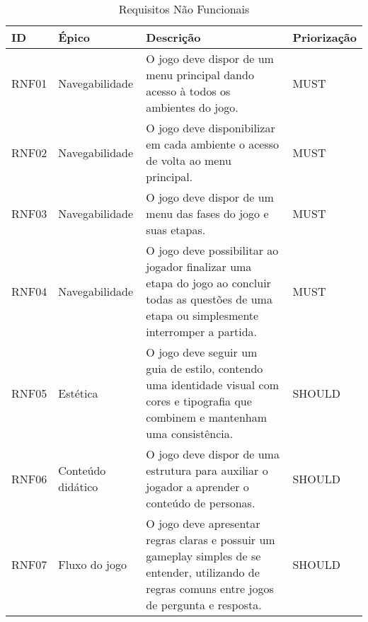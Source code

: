 \begin{table}[htbp]
    \centering
\caption{\textcolor{textmodified}{Requisitos Não Funcionais}}
\label{tab:Table_rnf}
\begin{tabular}{|p{1.3cm}|p{2.7cm}|p{8cm}|p{2.1cm}|}
\hline
ID    & Épico                        & Descrição & Priorização \\ \hline

\textcolor{textmodified}{ RNF01} & \textcolor{textmodified}{Navegabilidade}                & \textcolor{textmodified}{O jogo deve dispor de um menu principal dando acesso à todos os ambientes do jogo.} & \textcolor{textadded}{MUST} \\ \hline

\textcolor{textmodified}{ RNF02} & \textcolor{textmodified}{Navegabilidade}                & \textcolor{textmodified}{O jogo deve disponibilizar em cada ambiente o acesso de volta ao menu principal.} & \textcolor{textadded}{MUST} \\ \hline

\textcolor{textmodified}{ RNF03} & \textcolor{textmodified}{Navegabilidade}                & \textcolor{textmodified}{O jogo deve dispor de um menu das fases do jogo e suas etapas.} & \textcolor{textadded}{MUST} \\ \hline

\textcolor{textmodified}{ RNF04} & \textcolor{textmodified}{Navegabilidade}                & \textcolor{textmodified}{O jogo deve possibilitar ao jogador finalizar uma etapa do jogo ao concluir todas as questões de uma etapa ou simplesmente interromper a partida.} & \textcolor{textadded}{MUST} \\ \hline

RNF05 & Estética                    & \textcolor{textmodified}{O jogo deve seguir um guia de estilo, contendo uma identidade visual com cores e tipografia que combinem e mantenham uma consistência.} & \textcolor{textadded}{SHOULD} \\ \hline

RNF06 & Conteúdo didático                & O jogo deve dispor de uma estrutura para auxiliar o jogador a aprender o conteúdo de personas.  & \textcolor{textadded}{SHOULD} \\ \hline

\textcolor{textmodified}{ RNF07} & \textcolor{textmodified}{Fluxo do jogo}                & \textcolor{textmodified}{O jogo deve apresentar regras claras e possuir um gameplay simples de se entender, utilizando de regras comuns entre jogos de pergunta e resposta.} & \textcolor{textadded}{SHOULD} \\ \hline


\end{tabular}
\end{table}
